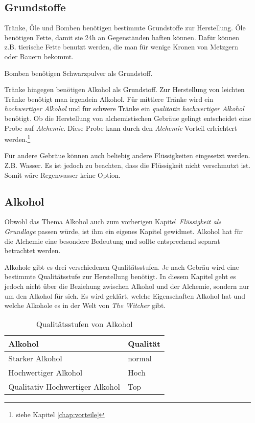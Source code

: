 \subsection{Grundstoffe}
\label{chap:fluessigkeit_als_grundlage}
Tränke, Öle und Bomben benötigen bestimmte Grundstoffe zur Herstellung. Öle benötigen Fette, damit sie 24h an Gegenständen haften können. Dafür können z.B. tierische Fette benutzt werden, die man für wenige Kronen von Metzgern oder Bauern bekommt.

Bomben benötigen Schwarzpulver als Grundstoff.

Tränke hingegen benötigen Alkohol als Grundstoff. Zur Herstellung von leichten Tränke benötigt man irgendein Alkohol. Für mittlere Tränke wird ein \textit{hochwertiger Alkohol} und für schwere Tränke ein \textit{qualitativ hochwertiger Alkohol} benötigt.  Ob die Herstellung von alchemistischen Gebräue gelingt entscheidet eine Probe auf \textit{Alchemie}. Diese Probe kann durch den \textit{Alchemie}-Vorteil erleichtert werden.\footnote{siehe Kapitel \ref{chap:vorteile}}

Für andere Gebräue können auch beliebig andere Flüssigkeiten eingesetzt werden. Z.B. Wasser. Es ist jedoch zu beachten, dass die Flüssigkeit nicht verschmutzt ist. Somit wäre Regenwasser keine Option. 

\subsection{Alkohol}
Obwohl das Thema Alkohol auch zum vorherigen Kapitel \textit{Flüssigkeit als Grundlage} passen würde, ist ihm ein eigenes Kapitel gewidmet. Alkohol hat für die Alchemie eine besondere Bedeutung und sollte entsprechend separat betrachtet werden.

Alkohole gibt es drei verschiedenen Qualitätsstufen. Je nach Gebräu wird eine bestimmte Qualitätsstufe zur Herstellung benötigt. In diesem Kapitel geht es jedoch nicht über die Beziehung zwischen Alkohol und der Alchemie, sondern nur um den Alkohol für sich. Es wird geklärt, welche Eigenschaften Alkohol hat und welche Alkohole es in der Welt von \textit{The Witcher} gibt.

\begin{table}[h]
\begin{center}
\begin{tabular}{|l|l|}
\hline
\textbf{Alkohol} & \textbf{Qualität} \\ \hline
Starker Alkohol & normal \\ \hline
Hochwertiger Alkohol & Hoch \\ \hline
Qualitativ Hochwertiger Alkohol & Top \\ \hline
\end{tabular}
\end{center}
\caption{Qualitätsstufen von Alkohol}
\label{tab:qualitaetsstufen_von_alkohol}
\end{table}

